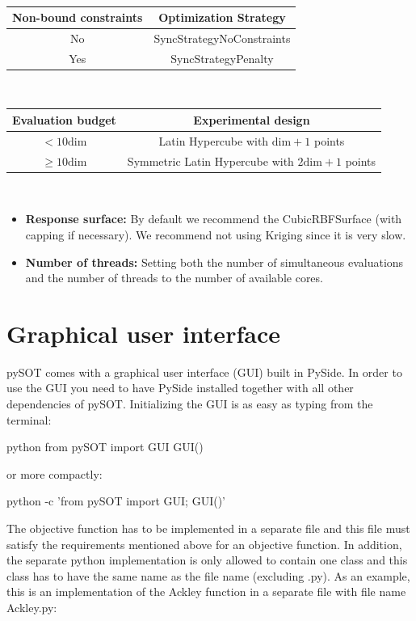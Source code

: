 \documentclass[]{article}
\begin{document}
\ \newline

\begin{center}
\begin{tabular}{ c | c }
  \hline			
Non-bound constraints & Optimization Strategy \\
  \hline  
  No & SyncStrategyNoConstraints \\
  Yes & SyncStrategyPenalty \\
  \hline
\end{tabular}
\end{center}

\ \newline

\begin{center}
\begin{tabular}{ c | c }
  \hline			
Evaluation budget & Experimental design \\
  \hline  
  $< 10 \text{dim}$ & Latin Hypercube with $\text{dim}+1$ points \\
  $\geq 10 \text{dim}$ & Symmetric Latin Hypercube with $2\text{dim}+1$ points \\
  \hline
\end{tabular}
\end{center}

\ \newline

\begin{itemize}
\item \textbf{Response surface:} By default we recommend the CubicRBFSurface (with capping if necessary). We recommend not using Kriging since it is very slow.
\item \textbf{Number of threads:}  Setting both the number of simultaneous evaluations and the number of threads to the number of available cores.
\end{itemize}

\section{Graphical user interface}
pySOT comes with a graphical user interface (GUI) built in PySide. In order to use the GUI you need to have PySide installed together with all other dependencies of pySOT. Initializing the GUI is as easy as typing from the terminal:
\begin{python}
python
from pySOT import GUI
GUI()
\end{python} 
or more compactly:
\begin{python}
python -c 'from pySOT import GUI; GUI()'
\end{python}
The objective function has to be implemented in a separate file and this file must satisfy the requirements mentioned above for an objective function. In addition, the separate python implementation is only allowed to contain one class and this class has to have the same name as the file name (excluding .py). As an example, this is an implementation of the Ackley function in a separate file with file name Ackley.py:
\end{document}

